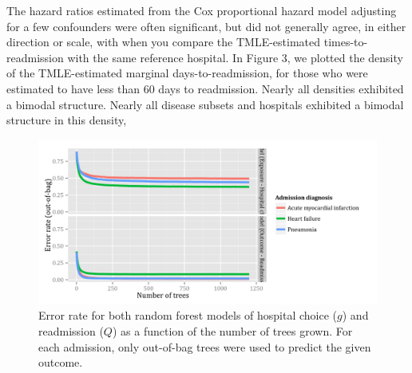 \documentclass[]{article}\usepackage[]{graphicx}\usepackage[]{color}
\begin{document}
The hazard ratios estimated from the Cox proportional hazard model adjusting for a few confounders were often significant, but did not generally agree, in either direction or scale, with when you compare the TMLE-estimated times-to-readmission with the same reference hospital. In Figure 3, we plotted the density of the TMLE-estimated marginal days-to-readmission, for those who were estimated to have less than 60 days to readmission. Nearly all densities exhibited a bimodal structure. Nearly all disease subsets and hospitals exhibited a bimodal structure in this density, 



\begin{figure}[H]
    \includegraphics{../figures/error_rate_for_hospital_choice.png}
    \caption[Error rate for random forest model of hospital choice.]
      {Error rate for both random forest models of hospital choice ($g$) and readmission ($Q$) as a function of the number of trees grown. For each admission, only out-of-bag trees were used to predict the given outcome.}
    \label{fig:error_rate_for_hospital_choice}
\end{figure}
\end{document}
